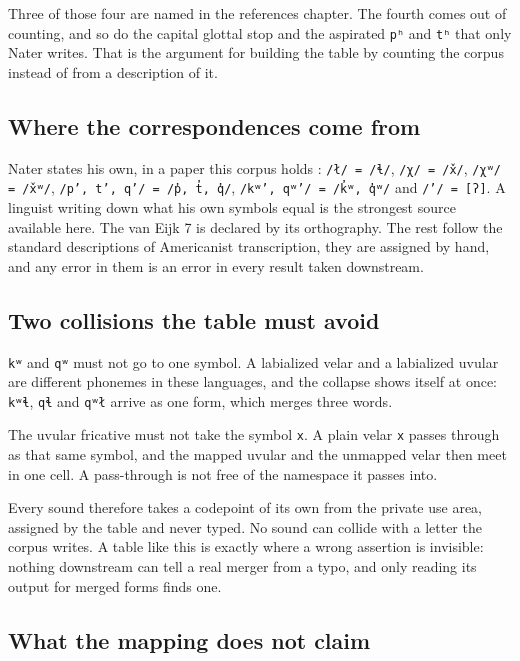 Three of those four are named in the references chapter. The fourth comes out of counting, and so
do the capital glottal stop and the aspirated \texttt{pʰ} and \texttt{tʰ} that only Nater writes.
That is the argument for building the table by counting the corpus instead of from a description of
it.

\subsection{Where the correspondences come from}

Nater states his own, in a paper this corpus holds \cite{src:Nater-2024}: \texttt{/ł/ = /ɬ/},
\texttt{/χ/ = /x̌/}, \texttt{/χʷ/ = /x̌ʷ/}, \texttt{/p’, t’, q’/ = /p̓, t̓, q̓/},
\texttt{/kʷ’, qʷ’/ = /k̓ʷ, q̓ʷ/} and \texttt{/’/ = [ʔ]}. A linguist writing down what his own symbols
equal is the strongest source available here. The van Eijk 7 is declared by its orthography. The
rest follow the standard descriptions of Americanist transcription, they are assigned by hand, and
any error in them is an error in every result taken downstream.

\subsection{Two collisions the table must avoid}

\texttt{kʷ} and \texttt{qʷ} must not go to one symbol. A labialized velar and a labialized uvular
are different phonemes in these languages, and the collapse shows itself at once: \texttt{kʷɬ},
\texttt{qɬ} and \texttt{qʷł} arrive as one form, which merges three words.

The uvular fricative must not take the symbol \texttt{x}. A plain velar \texttt{x} passes through as
that same symbol, and the mapped uvular and the unmapped velar then meet in one cell. A pass-through
is not free of the namespace it passes into.

Every sound therefore takes a codepoint of its own from the private use area, assigned by the table
and never typed. No sound can collide with a letter the corpus writes. A table like this is exactly
where a wrong assertion is invisible: nothing downstream can tell a real merger from a typo, and
only reading its output for merged forms finds one.

\subsection{What the mapping does not claim}

